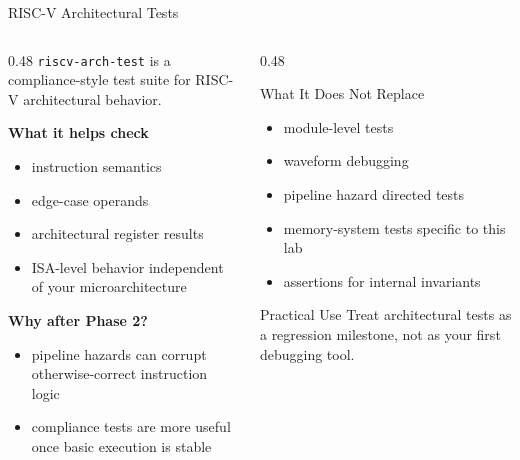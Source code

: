 \documentclass[aspectratio=169,10pt]{beamer}
\begin{document}
\begin{frame}{RISC-V Architectural Tests}
  \begin{columns}[T]
    \begin{column}{0.48\textwidth}
      \texttt{riscv-arch-test} is a compliance-style test suite for RISC-V architectural behavior.

      \vspace{0.7em}
      \textbf{What it helps check}
      \begin{itemize}
        \item instruction semantics
        \item edge-case operands
        \item architectural register results
        \item ISA-level behavior independent of your microarchitecture
      \end{itemize}

      \vspace{0.7em}
      \textbf{Why after Phase 2?}
      \begin{itemize}
        \item pipeline hazards can corrupt otherwise-correct instruction logic
        \item compliance tests are more useful once basic execution is stable
      \end{itemize}
    \end{column}
    \begin{column}{0.48\textwidth}
      \begin{block}{What It Does Not Replace}
        \begin{itemize}\small
          \item module-level tests
          \item waveform debugging
          \item pipeline hazard directed tests
          \item memory-system tests specific to this lab
          \item assertions for internal invariants
        \end{itemize}
      \end{block}

      \vspace{0.7em}
      \begin{exampleblock}{Practical Use}
        Treat architectural tests as a regression milestone, not as your first debugging tool.
      \end{exampleblock}
    \end{column}
  \end{columns}
\end{frame}
\end{document}
